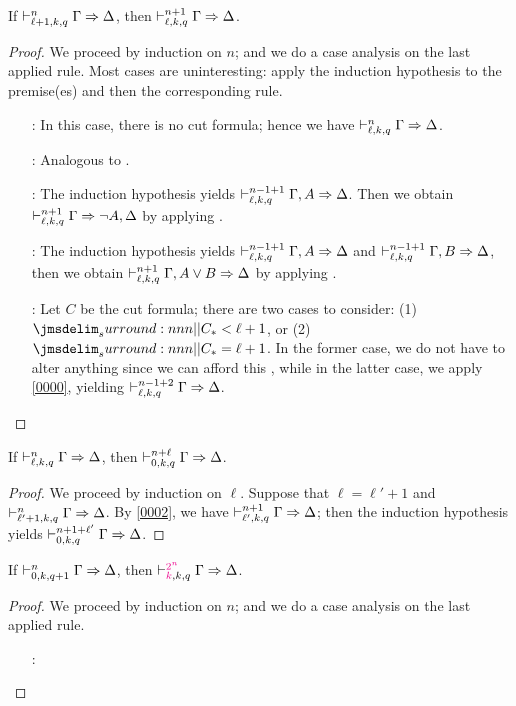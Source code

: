 \documentclass[a4paper]{article}
\begin{document}
\begin{lemma}\label{0002}
  If $\mathrel{\vdash^{n}_{\ell + 1,k,q}} \Gamma \Rightarrow \Delta$, then $\mathrel{\vdash^{n+1}_{\ell,k,q}} \Gamma \Rightarrow \Delta$.
\end{lemma}
\begin{proof}
  We proceed by induction on $n$; and we do a case analysis on the last applied rule.
  Most cases are uninteresting: apply the induction hypothesis to the premise(es) and then the corresponding rule.
  \begin{itemize}
  \item[\rId:] In this case, there is no cut formula; hence we have $\mathrel{\vdash^{n}_{\ell,k,q}} \Gamma \Rightarrow \Delta$.
  \item[\rLBot:] Analogous to \rId.
  \item[\rRNot:] The induction hypothesis yields $\mathrel{\vdash^{n - 1 + 1}_{\ell,k,q}} \Gamma, A \Rightarrow \Delta$.
    Then we obtain $\mathrel{\vdash^{n+1}_{\ell,k,q}} \Gamma \Rightarrow \lnot A, \Delta$ by applying \rRNot.
  \item[\rLDis:] The induction hypothesis yields $\mathrel{\vdash^{n - 1 + 1}_{\ell,k,q}} \Gamma, A \Rightarrow \Delta$ and $\mathrel{\vdash^{n - 1 + 1}_{\ell,k,q}} \Gamma, B \Rightarrow \Delta$, then we obtain $\mathrel{\vdash^{n+1}_{\ell,k,q}} \Gamma, A \vee B \Rightarrow \Delta$ by applying \rLDis.
  \item[\rCut:] Let $C$ be the cut formula; there are two cases to consider: (1) $\dRank{C} < \ell + 1$, or (2) $\dRank{C} = \ell + 1$.
    In the former case, we do not have to alter anything since we can afford this \rCut, while in the latter case, we apply \cref{0000}, yielding $\mathrel{\vdash^{n - 1 + 2}_{\ell,k,q}} \Gamma \Rightarrow \Delta$.
  \end{itemize}
\end{proof}

\begin{lemma}\label{0003}
  If $\mathrel{\vdash^{n}_{\ell,k,q}} \Gamma \Rightarrow \Delta$, then $\mathrel{\vdash^{n + \ell}_{0,k,q}} \Gamma \Rightarrow \Delta$.
\end{lemma}
\begin{proof}
  We proceed by induction on $\ell$.
  Suppose that $\ell = \ell' + 1$ and $\mathrel{\vdash^{n}_{\ell' + 1,k,q}} \Gamma \Rightarrow \Delta$.
  By \cref{0002}, we have $\mathrel{\vdash^{n + 1}_{\ell',k,q}} \Gamma \Rightarrow \Delta$; then the induction hypothesis yields $\mathrel{\vdash^{n + 1 + \ell'}_{0,k,q}} \Gamma \Rightarrow \Delta$.
\end{proof}

\begin{lemma}\label{0005}
  If $\mathrel{\vdash^{n}_{0,k,q+1}} \Gamma \Rightarrow \Delta$, then $\mathrel{\vdash^{\textcolor{magenta}{2^n}}_{\textcolor{magenta}{k},k,q}} \Gamma \Rightarrow \Delta$.
\end{lemma}
\begin{proof}
  We proceed by induction on $n$; and we do a case analysis on the last applied rule.
  \begin{itemize}
  \item[\rCut:] 
  \end{itemize}
\end{proof}
\end{document}
